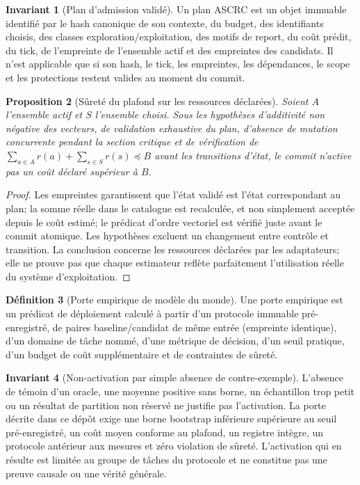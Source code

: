 \documentclass[11pt,a4paper]{article}
\theoremstyle{definition}
\newtheorem{definition}{Définition}[section]
\newtheorem{invariant}[definition]{Invariant}
\theoremstyle{plain}
\newtheorem{proposition}[definition]{Proposition}
\theoremstyle{remark}
\begin{document}
\begin{invariant}[Plan d'admission validé]
Un plan ASCRC est un objet immuable identifié par le hash canonique de son contexte, du budget, des identifiants choisis, des classes exploration/exploitation, des motifs de report, du coût prédit, du tick, de l'empreinte de l'ensemble actif et des empreintes des candidats. Il n'est applicable que si son hash, le tick, les empreintes, les dépendances, le scope et les protections restent valides au moment du commit.
\end{invariant}

\begin{proposition}[Sûreté du plafond sur les ressources déclarées]
Soient $A$ l'ensemble actif et $S$ l'ensemble choisi. Sous les hypothèses d'additivité non négative des vecteurs, de validation exhaustive du plan, d'absence de mutation concurrente pendant la section critique et de vérification de $\sum_{a\in A}r(a)+\sum_{s\in S}r(s)\preceq B$ avant les transitions d'état, le commit n'active pas un coût déclaré supérieur à $B$.
\end{proposition}
\begin{proof}
Les empreintes garantissent que l'état validé est l'état correspondant au plan; la somme réelle dans le catalogue est recalculée, et non simplement acceptée depuis le coût estimé; le prédicat d'ordre vectoriel est vérifié juste avant le commit atomique. Les hypothèses excluent un changement entre contrôle et transition. La conclusion concerne les ressources déclarées par les adaptateurs; elle ne prouve pas que chaque estimateur reflète parfaitement l'utilisation réelle du système d'exploitation.
\end{proof}

\begin{definition}[Porte empirique de modèle du monde]
Une porte empirique est un prédicat de déploiement calculé à partir d'un protocole immuable pré-enregistré, de paires baseline/candidat de même entrée (empreinte identique), d'un domaine de tâche nommé, d'une métrique de décision, d'un seuil pratique, d'un budget de coût supplémentaire et de contraintes de sûreté.
\end{definition}

\begin{invariant}[Non-activation par simple absence de contre-exemple]
L'absence de témoin d'un oracle, une moyenne positive sans borne, un échantillon trop petit ou un résultat de partition non réservé ne justifie pas l'activation. La porte décrite dans ce dépôt exige une borne bootstrap inférieure supérieure au seuil pré-enregistré, un coût moyen conforme au plafond, un registre intègre, un protocole antérieur aux mesures et zéro violation de sûreté. L'activation qui en résulte est limitée au groupe de tâches du protocole et ne constitue pas une preuve causale ou une vérité générale.
\end{invariant}
\end{document}
